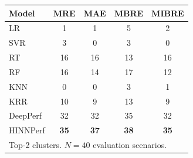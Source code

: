 \begin{tabular}{lcccc}
\toprule
Model & MRE & MAE & MBRE & MIBRE \\
\midrule
LR & 1 & 1 & 5 & 2 \\
SVR & 3 & 0 & 3 & 0 \\
RT & 16 & 16 & 13 & 16 \\
RF & 16 & 14 & 17 & 12 \\
KNN & 0 & 0 & 3 & 1 \\
KRR & 10 & 9 & 13 & 9 \\
DeepPerf & 32 & 32 & 35 & 32 \\
HINNPerf & \textbf{35} & \textbf{37} & \textbf{38} & \textbf{35} \\
\midrule
\multicolumn{5}{l}{\footnotesize Top-2 clusters. $N=40$ evaluation scenarios.} \\
\bottomrule
\end{tabular}
